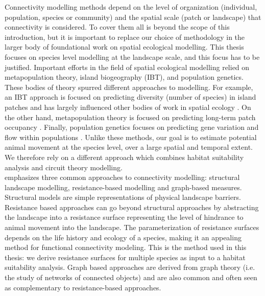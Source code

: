 \documentclass[12pt,Bold,TexShade]{thesis/mcgilletdclass}
\begin{document}
{Connectivity modelling methods depend on the level of organization (individual, population, species or community) and the spatial scale (patch or  landscape) that connectivity is considered. To cover them all is beyond the scope of this introduction, but it is important to replace our choice of methodology in the larger body of foundational work on spatial ecological modelling. This thesis focuses on species level modelling at the landscape scale, and this focus has to be justified. Important efforts in the field of spatial ecological modelling relied on metapopulation theory, island biogeography (IBT), and population genetics. These bodies of theory spurred different approaches to modelling. For example, an IBT approach is focused on predicting diversity (number of species) in island patches \citep{macarthur_theory_1967} and has largely influenced other bodies of work in spatial ecology \citep{warren_how_2020}. On the other hand, metapopulation theory is focused on predicting long-term patch occupancy \citep{hanski_habitat_1999, hanski_metapopulation_2000}. Finally, population genetics focuses on predicting gene variation and flow within populations \citep{lewontin_population_1985, charlesworth_population_2017}. Unlike these methods, our goal is to estimate potential animal movement at the species level, over a large spatial and temporal extent. We therefore rely on a different approach which combines habitat suitability analysis and circuit theory modelling.\\

\cite{fletcher_spatial_2018} emphasizes three common approaches to connectivity modelling: structural landscape modelling, resistance-based modelling and graph-based measures. Structural models are simple representations of physical landscape barriers. Resistance based approaches can go beyond structural approaches by abstracting the landscape into a resistance surface representing the level of hindrance to animal movement into the landscape. The parameterization of resistance surfaces depends on the life history and ecology of a species, making it an appealing method for functional connectivity modeling.  This is the method used in this thesis: we derive resistance surfaces for multiple species as input to a habitat suitability analysis. Graph based approaches are derived from graph theory (i.e. the study of networks of connected objects) and are also common and often seen as complementary to resistance-based approaches. \\

}
\end{document}
